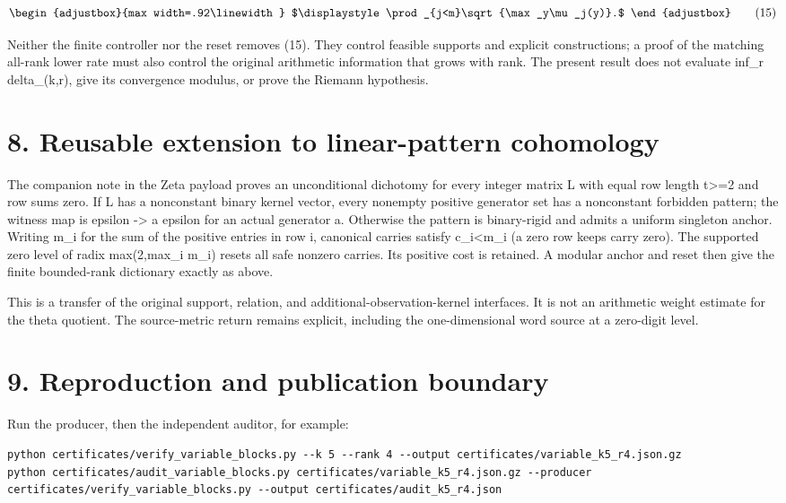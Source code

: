 \[
\begin{adjustbox}{max width=.92\linewidth}
$\displaystyle \prod_{j<m}\sqrt{\max_y\mu_j(y)}.$
\end{adjustbox}
\tag{15}
\]

Neither the finite controller nor the reset removes (15). They control feasible supports and explicit constructions; a proof of the matching all-rank lower rate must also control the original arithmetic information that grows with rank. The present result does not evaluate inf\_r delta\_(k,r), give its convergence modulus, or prove the Riemann hypothesis.

\section{8. Reusable extension to linear-pattern cohomology}\label{n07-reusable-extension-to-linear-pattern-cohomology}

The companion note in the Zeta payload proves an unconditional dichotomy for every integer matrix L with equal row length t\textgreater=2 and row sums zero. If L has a nonconstant binary kernel vector, every nonempty positive generator set has a nonconstant forbidden pattern; the witness map is epsilon -\textgreater{} a epsilon for an actual generator a. Otherwise the pattern is binary-rigid and admits a uniform singleton anchor. Writing m\_i for the sum of the positive entries in row i, canonical carries satisfy \textbar c\_i\textbar\textless m\_i (a zero row keeps carry zero). The supported zero level of radix max(2,max\_i m\_i) resets all safe nonzero carries. Its positive cost is retained. A modular anchor and reset then give the finite bounded-rank dictionary exactly as above.

This is a transfer of the original support, relation, and additional-observation-kernel interfaces. It is not an arithmetic weight estimate for the theta quotient. The source-metric return remains explicit, including the one-dimensional word source at a zero-digit level.

\section{9. Reproduction and publication boundary}\label{n07-reproduction-and-publication-boundary}

Run the producer, then the independent auditor, for example:

\begin{Verbatim}[breaklines=true,breakanywhere=true,fontsize=\footnotesize]
python certificates/verify_variable_blocks.py --k 5 --rank 4 --output certificates/variable_k5_r4.json.gz
python certificates/audit_variable_blocks.py certificates/variable_k5_r4.json.gz --producer certificates/verify_variable_blocks.py --output certificates/audit_k5_r4.json
\end{Verbatim}

